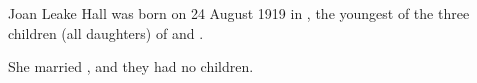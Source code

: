 
Joan Leake Hall was born on 24 August 1919 in ,\cite{JLHbirth}
the youngest of the three children (all daughters)
of  and .

She married , and they had no children.
